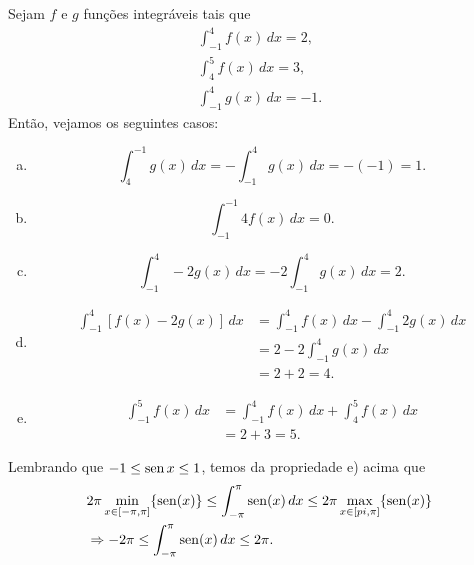 \begin{ex}
  Sejam $f$ e $g$ funções integráveis tais que
  \begin{align}
    \int_{-1}^4 f(x)\,dx = 2,\\
    \int_4^5 f(x)\,dx = 3,\\
    \int_{-1}^4 g(x)\,dx = -1.
  \end{align}
  Então, vejamos os seguintes casos:
  \begin{enumerate}[a)]
  \item
    \begin{equation}
      \int_{4}^{-1} g(x)\,dx = -\int_{-1}^4 g(x)\,dx = -(-1) = 1.
    \end{equation}
  \item
    \begin{equation}
      \int_{-1}^{-1} 4f(x)\,dx = 0.
    \end{equation}
  \item
    \begin{equation}
      \int_{-1}^{4} -2g(x)\,dx = -2\int_{-1}^4 g(x)\,dx = 2.
    \end{equation}
  \item
    \begin{align}
      \int_{-1}^{4} \left[f(x) - 2g(x)\right]\,dx &= \int_{-1}^{4} f(x)\,dx - \int_{-1}^4 2g(x)\,dx \\
                                                  &= 2 - 2\int_{-1}^4 g(x)\,dx \\
                                                  &= 2 + 2 = 4.
    \end{align}
  \item
    \begin{align}
      \int_{-1}^5 f(x)\,dx &= \int_{-1}^4 f(x)\,dx + \int_{4}^5 f(x)\,dx \\
                           &= 2 + 3 = 5.
    \end{align}
  \end{enumerate}
\end{ex}

\begin{ex}
  Lembrando que $-1 \leq \operatorname{sen} x \leq 1$, temos da propriedade e) acima que
  \begin{align}
    &2\pi \min_{x\in [-\pi, \pi]} \{\operatorname{sen}(x)\} \leq \int_{-\pi}^\pi \operatorname{sen}(x)\,dx \leq 2\pi \max_{x\in [\-pi, \pi]} \{\operatorname{sen}(x)\} \\
    &\Rightarrow -2\pi \leq \int_{-\pi}^\pi \operatorname{sen}(x)\,dx \leq 2\pi.
  \end{align}
\end{ex}

